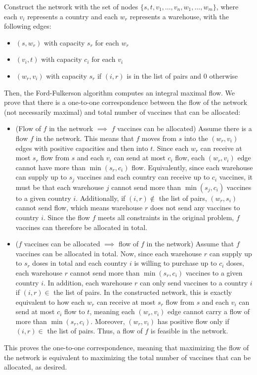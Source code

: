 \documentclass[11pt]{article}
\begin{document}
Construct the network with the set of nodes $\{s,t,v_1,\ldots,v_n,w_1,\ldots,w_m\}$, where each $v_i$ represents a country and each $w_r$ represents a warehouse, with the following edges:\begin{itemize}
    \item $(s,w_r)$ with capacity $s_r$ for each $w_r$
    \item $(v_i,t)$ with capacity $c_i$ for each $v_i$
    \item $(w_r,v_i)$ with capacity $s_r$ if $(i,r)$ is in the list of pairs and $0$ otherwise
\end{itemize}Then, the Ford-Fulkerson algorithm computes an integral maximal flow. We prove that there is a one-to-one correspondence between the flow of the network (not necessarily maximal) and total number of vaccines that can be allocated:\begin{itemize}
    \item (Flow of $f$ in the network $\implies$ $f$ vaccines can be allocated) Assume there is a flow $f$ in the network. This means that $f$ moves from $s$ into the $(w_r,v_i)$ edges with positive capacities and then into $t$. Since each $w_r$ can receive at most $s_r$ flow from $s$ and each $v_i$ can send at most $c_i$ flow, each $(w_r,v_i)$ edge cannot have more than $\min(s_r,c_i)$ flow. Equivalently, since each warehouse can supply up to $s_j$ vaccines and each country can receive up to $c_i$ vaccines, it must be that each warehouse $j$ cannot send more than $\min(s_j,c_i)$ vaccines to a given country $i$. Additionally, if $(i,r)\notin$ the list of pairs, $(w_r,s_i)$ cannot send flow, which means warehouse $r$ does not send any vaccines to country $i$. Since the flow $f$ meets all constraints in the original problem, $f$ vaccines can therefore be allocated in total.
    \item ($f$ vaccines can be allocated $\implies$ flow of $f$ in the network) Assume that $f$ vaccines can be allocated in total. Now, since each warehouse $r$ can supply up to $s_r$ doses in total and each country $i$ is willing to purchase up to $c_i$ doses, each warehouse $r$ cannot send more than $\min(s_r,c_i)$ vaccines to a given country $i$. In addition, each warehouse $r$ can only send vaccines to a country $i$ if $(i,r)\in$ the list of pairs. In the constructed network, this is exactly equivalent to how each $w_r$ can receive at most $s_r$ flow from $s$ and each $v_i$ can send at most $c_i$ flow to $t$, meaning each $(w_r,v_i)$ edge cannot carry a flow of more than $\min(s_r,c_i)$. Moreover, $(w_r,v_i)$ has positive flow only if $(i,r)\in$ the list of pairs. Thus, a flow of $f$ is feasible in the network.
\end{itemize}This proves the one-to-one correspondence, meaning that maximizing the flow of the network is equivalent to maximizing the total number of vaccines that can be allocated, as desired.
\end{document}
